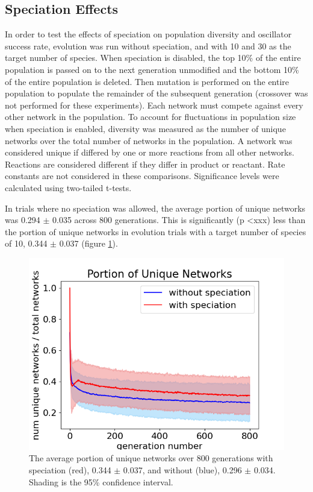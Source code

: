 \documentclass[12pt]{report}
\begin{document}
\subsection{Speciation Effects}
\label{section:speciation}
In order to test the effects of speciation on population diversity and oscillator success rate, evolution was run without speciation, and with 10 and 30 as the target number of species. When speciation is disabled, the top 10\% of the entire population is passed on to the next generation unmodified and the bottom 10\% of the entire population is deleted. Then mutation is performed on the entire population to populate the remainder of the subsequent generation (crossover was not performed for these experiments). Each network must compete against every other network in the population. To account for fluctuations in population size when speciation is enabled, diversity was measured as the number of unique networks over the total number of networks in the population. A network was considered unique if differed by one or more reactions from all other networks. Reactions are considered different if they differ in product or reactant. Rate constants are not considered in these comparisons. Significance levels were calculated using two-tailed t-tests. 


In trials where no speciation was allowed, the average portion of unique networks was 0.294 $\pm$ 0.035 across 800 generations. This is significantly (p \textless xxx) less than the portion of unique networks in evolution trials with a target number of species of 10, 0.344 $\pm$ 0.037 (figure \ref{fig:num_unique_species}).

\begin{figure}
\centering
    \includegraphics[width=15cm]{images/num_unique_networks.png}
    \caption[Unique networks with and without speciation]{The average portion of unique networks over 800 generations with speciation (red), 0.344 $\pm$ 0.037, and without (blue), 0.296 $\pm$ 0.034. Shading is the 95\% confidence interval.}
    \label{fig:num_unique_species}
\end{figure}
\end{document}
